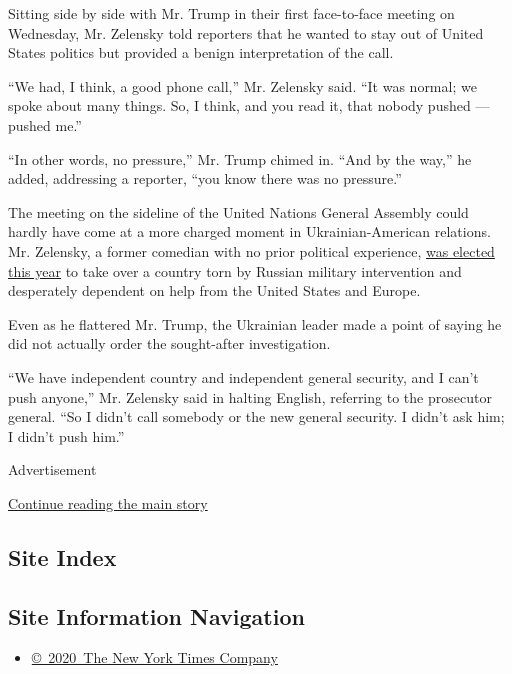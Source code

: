 Sitting side by side with Mr. Trump in their first face-to-face meeting
on Wednesday, Mr. Zelensky told reporters that he wanted to stay out of
United States politics but provided a benign interpretation of the call.

``We had, I think, a good phone call,'' Mr. Zelensky said. ``It was
normal; we spoke about many things. So, I think, and you read it, that
nobody pushed --- pushed me.''

``In other words, no pressure,'' Mr. Trump chimed in. ``And by the
way,'' he added, addressing a reporter, ``you know there was no
pressure.''

The meeting on the sideline of the United Nations General Assembly could
hardly have come at a more charged moment in Ukrainian-American
relations. Mr. Zelensky, a former comedian with no prior political
experience,
\href{https://www.nytimes.com/2019/04/21/world/europe/Volodymyr-Zelensky-ukraine-elections.html}{was
elected this year} to take over a country torn by Russian military
intervention and desperately dependent on help from the United States
and Europe.

Even as he flattered Mr. Trump, the Ukrainian leader made a point of
saying he did not actually order the sought-after investigation.

``We have independent country and independent general security, and I
can't push anyone,'' Mr. Zelensky said in halting English, referring to
the prosecutor general. ``So I didn't call somebody or the new general
security. I didn't ask him; I didn't push him.''

Advertisement

\protect\hyperlink{after-bottom}{Continue reading the main story}

\hypertarget{site-index}{%
\subsection{Site Index}\label{site-index}}

\hypertarget{site-information-navigation}{%
\subsection{Site Information
Navigation}\label{site-information-navigation}}

\begin{itemize}
\tightlist
\item
  \href{https://help.nytimes.com/hc/en-us/articles/115014792127-Copyright-notice}{©~2020~The
  New York Times Company}
\end{itemize}

